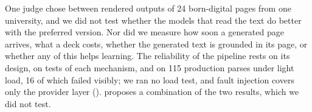 One judge chose between rendered outputs of 24 born-digital pages from one
university, and we did not test whether the models that read the text do
better with the preferred version. Nor did we measure how soon a generated
page arrives, what a deck costs, whether the generated text is grounded in its
page, or whether any of this helps learning. The reliability of the pipeline
rests on its design, on tests of each mechanism, and on 115 production parses
under light load, 16 of which failed visibly; we ran no load test, and fault
injection covers only the provider layer
().
 proposes a combination of the two results, which we did
not test.
